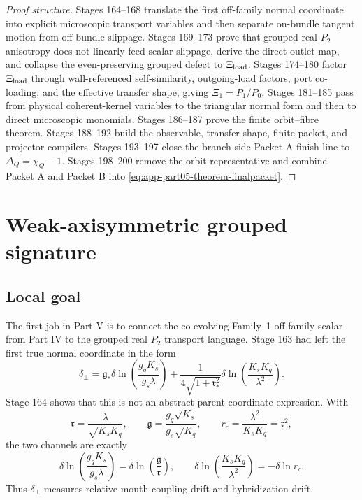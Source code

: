 \begin{proof}[Proof structure]
Stages 164--168 translate the first off-family normal coordinate into explicit microscopic transport variables and then separate on-bundle tangent motion from off-bundle slippage.  Stages 169--173 prove that grouped real \(P_2\) anisotropy does not linearly feed scalar slippage, derive the direct outlet map, and collapse the even-preserving grouped defect to \(\Xi_{\rm load}\).  Stages 174--180 factor \(\Xi_{\rm load}\) through wall-referenced self-similarity, outgoing-load factors, port co-loading, and the effective transfer shape, giving \(\Xi_1=P_1/P_0\).  Stages 181--185 pass from physical coherent-kernel variables to the triangular normal form and then to direct microscopic monomials.  Stages 186--187 prove the finite orbit--fibre theorem.  Stages 188--192 build the observable, transfer-shape, finite-packet, and projector compilers.  Stages 193--197 close the branch-side Packet-A finish line to \(\Delta_Q=\chi_Q-1\).  Stages 198--200 remove the orbit representative and combine Packet A and Packet B into \eqref{eq:app-part05-theorem-finalpacket}.
\end{proof}

\section{Weak-axisymmetric grouped signature}
\label{sec:app-part05_weak_axisymmetric_orbit:weak-axisymmetric-grouped-signature}

\subsection{Local goal}
The first job in Part V is to connect the co-evolving Family--1 off-family scalar from Part IV to the grouped real \(P_2\) transport language.  Stage 163 had left the first true normal coordinate in the form
\begin{equation}
\label{eq:app-part05-delta-perp-original}
\delta_\perp
=
\mathfrak g_*
\delta\ln\!\left(\frac{g_qK_s}{g_s\lambda}\right)
+
\frac{1}{4\sqrt{1+\mathfrak r_*^2}}
\delta\ln\!\left(\frac{K_sK_q}{\lambda^2}\right).
\end{equation}
Stage 164 shows that this is not an abstract parent-coordinate expression.  With
\begin{equation}
\label{eq:app-part05-rg-defs}
\mathfrak r=\frac{\lambda}{\sqrt{K_sK_q}},
\qquad
\mathfrak g=\frac{g_q\sqrt{K_s}}{g_s\sqrt{K_q}},
\qquad
r_c=\frac{\lambda^2}{K_sK_q}=\mathfrak r^2,
\end{equation}
the two channels are exactly
\begin{equation}
\label{eq:app-part05-log-channels-rg}
\delta\ln\!\left(\frac{g_qK_s}{g_s\lambda}\right)
=
\delta\ln\!\left(\frac{\mathfrak g}{\mathfrak r}\right),
\qquad
\delta\ln\!\left(\frac{K_sK_q}{\lambda^2}\right)
=-\delta\ln r_c.
\end{equation}
Thus \(\delta_\perp\) measures relative mouth-coupling drift and hybridization drift.

